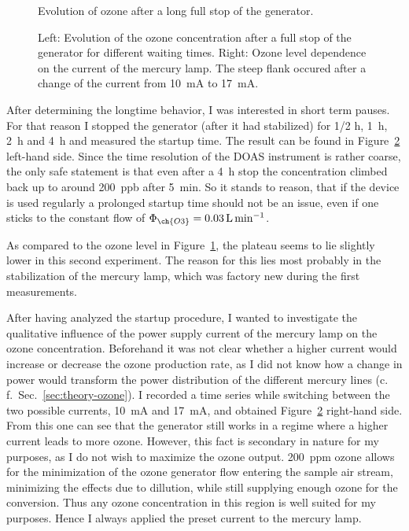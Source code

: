 \begin{figure}[htbp]
  \centering
  
  \caption{Evolution of ozone after a long full stop of the
    generator.}
  \label{fig:long-stop}
\end{figure}
\begin{figure}[htbp]
  \centering
  
  \hfill
  
  \caption{Left: Evolution of the ozone concentration after a full stop of the
    generator for different waiting times. Right: Ozone level
    dependence on the current of the mercury lamp. The steep
    flank occured after a change of the current from
    \SI{10}{\milli\ampere} to \SI{17}{\milli\ampere}.}
  \label{fig:multiple-stop}
\end{figure}

After determining the longtime behavior, I was interested in
short term pauses. For that reason I stopped the generator (after it
had stabilized) for {\nfrac{} 1/2} \si{\hour}, \SI{1}{\hour},
\SI{2}{\hour} and \SI{4}{\hour} and measured the startup time. The
result can be found in Figure~\ref{fig:multiple-stop}
left-hand side. Since the time resolution of the DOAS instrument is
rather coarse, the only safe statement is that even after a
\SI{4}{\hour} stop the concentration climbed back up to around
\SI{200}{ppb} after \SI{5}{\minute}. So it stands to reason, that if
the device is used regularly a prolonged startup time should not be an
issue, even if one sticks to the constant flow of $\Phi_{\ch{O3}} =
\SI{0.03}{\liter\per\minute}$.

As compared to the ozone level in Figure~\ref{fig:long-stop}, the
plateau seems to lie slightly lower in this second experiment. The
reason for this lies most probably in the stabilization of the mercury
lamp, which was factory new during the first measurements.

After having analyzed the startup procedure, I wanted to investigate
the qualitative influence of the power supply current of the mercury
lamp on the ozone concentration. Beforehand it was not clear whether a
higher current would increase or decrease the ozone production rate,
as I did not know how a change in power would transform the power
distribution of the different mercury lines (c.\,f.\
Sec.~\ref{sec:theory-ozone}). I recorded a time series while switching
between the two possible currents, \SI{10}{\milli\ampere} and
\SI{17}{\milli\ampere}, and obtained Figure~\ref{fig:multiple-stop}
right-hand side. From this one can see that the generator still works
in a regime where a higher current leads to more ozone. However, this
fact is secondary in nature for my purposes, as I do not wish to
maximize the ozone output. \SI{200}{ppm} ozone allows for the
minimization of the ozone generator flow entering the sample air
stream, minimizing the effects due to dillution, while still supplying
enough ozone for the conversion. Thus any ozone concentration in this
region is well suited for my purposes. Hence I always applied the
preset current to the mercury lamp.

